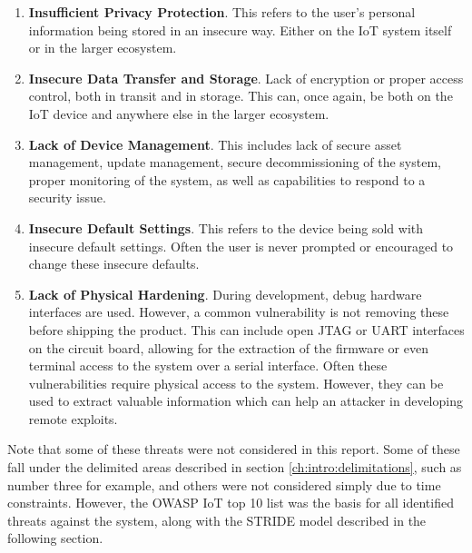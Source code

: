 \begin{enumerate}
    \item \textbf{Insufficient Privacy Protection}. This refers to the user's personal information being stored in an insecure way. Either on the IoT system itself or in the larger ecosystem.
    
    \item \textbf{Insecure Data Transfer and Storage}. Lack of encryption or proper access control, both in transit and in storage. This can, once again, be both on the IoT device and anywhere else in the larger ecosystem.
    
    \item \textbf{Lack of Device Management}. This includes lack of secure asset management, update management, secure decommissioning of the system, proper monitoring of the system, as well as capabilities to respond to a security issue.
    
    \item \textbf{Insecure Default Settings}. This refers to the device being sold with insecure default settings. Often the user is never prompted or encouraged to change these insecure defaults.
    
    \item \textbf{Lack of Physical Hardening}. During development, debug hardware interfaces are used. However, a common vulnerability is not removing these before shipping the product. This can include open JTAG or UART interfaces on the circuit board, allowing for the extraction of the firmware or even terminal access to the system over a serial interface. Often these vulnerabilities require physical access to the system. However, they can be used to extract valuable information which can help an attacker in developing remote exploits.
\end{enumerate}
Note that some of these threats were not considered in this report. Some of these fall under the delimited areas described in section \ref{ch:intro:delimitations}, such as number three for example, and others were not considered simply due to time constraints. However, the OWASP IoT top 10 list was the basis for all identified threats against the system, along with the STRIDE model described in the following section.

